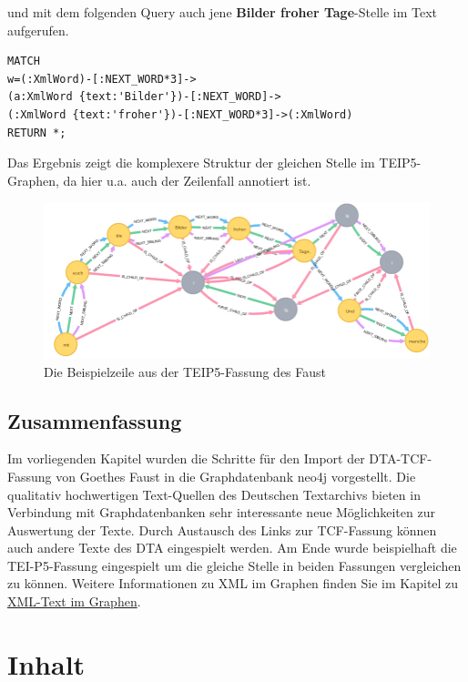 \documentclass[ngerman,]{scrreprt}
\begin{document}
und mit dem folgenden Query auch jene \textbf{Bilder froher Tage}-Stelle im Text aufgerufen.

\begin{verbatim}
MATCH
w=(:XmlWord)-[:NEXT_WORD*3]->
(a:XmlWord {text:'Bilder'})-[:NEXT_WORD]->
(:XmlWord {text:'froher'})-[:NEXT_WORD*3]->(:XmlWord)
RETURN *;
\end{verbatim}

Das Ergebnis zeigt die komplexere Struktur der gleichen Stelle im TEIP5-Graphen, da hier u.a. auch der Zeilenfall annotiert ist.

\begin{figure}
\centering
\includegraphics{Bilder/TEI2Graph/BilderFroherTageP5.png}
\caption{Die Beispielzeile aus der TEIP5-Fassung des Faust}
\end{figure}

\section{Zusammenfassung}\label{zusammenfassung-5}

Im vorliegenden Kapitel wurden die Schritte für den Import der DTA-TCF-Fassung von Goethes Faust in die Graphdatenbank neo4j vorgestellt. Die qualitativ hochwertigen Text-Quellen des Deutschen Textarchivs bieten in Verbindung mit Graphdatenbanken sehr interessante neue Möglichkeiten zur Auswertung der Texte. Durch Austausch des Links zur TCF-Fassung können auch andere Texte des DTA eingespielt werden. Am Ende wurde beispielhaft die TEI-P5-Fassung eingespielt um die gleiche Stelle in beiden Fassungen vergleichen zu können. Weitere Informationen zu XML im Graphen finden Sie im Kapitel zu \href{https://kuczera.github.io/Graphentechnologien/60_XML-Text-im-Graphen.html}{XML-Text im Graphen}.

\chapter{Inhalt}\label{inhalt-7}
\end{document}

